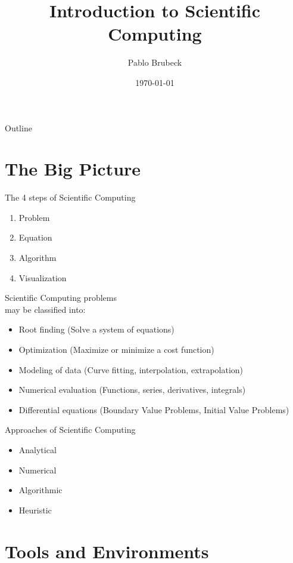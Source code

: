 \documentclass[xcolor={dvipsnames}]{beamer}
\title{Introduction to Scientific Computing}
\author{Pablo Brubeck\inst{1}}
\institute[ITESM]
{
  \inst{1}%
  Department of Physics\\
  Tecnologico de Monterrey
}
\date{\today}
\begin{document}
\begin{frame}
  \titlepage
\end{frame}

\begin{frame}{Outline}
  \tableofcontents
\end{frame}


\section{The Big Picture}

\begin{frame}{The 4 steps of Scientific Computing}{}
\begin{enumerate}
\item Problem
\item Equation
\item Algorithm
\item Visualization
\end{enumerate}
\end{frame}


\begin{frame}{Scientific Computing problems\\ may be classified into:}{}
\begin{itemize}
\item Root finding (Solve a system of equations)
\item Optimization (Maximize or minimize a cost function)
\item Modeling of data (Curve fitting, interpolation, extrapolation)
\item Numerical evaluation (Functions, series, derivatives, integrals)
\item Differential equations (Boundary Value Problems, Initial Value Problems)
\end{itemize}
\end{frame}

\begin{frame}{Approaches of Scientific Computing}{}
\begin{itemize}
	\item Analytical
	\item Numerical
	\item Algorithmic
	\item Heuristic
\end{itemize}
\end{frame}


\section{Tools and Environments}
\end{document}
